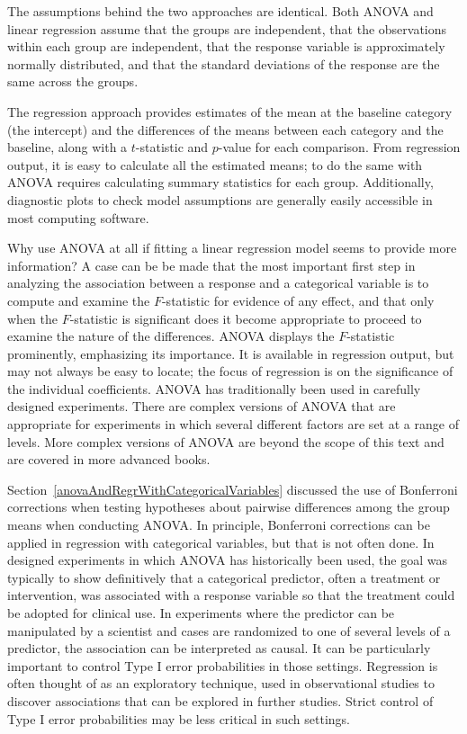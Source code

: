 The assumptions behind the two approaches are identical.  Both ANOVA and linear regression assume that the groups are independent, that the observations within each group are independent, that the response variable is approximately normally distributed, and that the standard deviations of the response are the same across the groups.  

The regression approach provides estimates of the mean at the baseline category (the intercept) and the differences of the means between each category and the baseline, along with a $t$-statistic and $p$-value for each comparison. From regression output, it is easy to calculate all the estimated means; to do the same with ANOVA requires calculating summary statistics for each group. Additionally, diagnostic plots to check model assumptions are generally easily accessible in most computing software.  

Why use ANOVA at all if fitting a linear regression model seems to provide more information?  A case can be be made that the most important first step in analyzing the association between a response and a categorical variable is to compute and examine the $F$-statistic for evidence of any effect, and that only when the $F$-statistic is significant does it become appropriate to proceed to examine the nature of the differences. ANOVA displays the $F$-statistic prominently, emphasizing its importance. It is available in regression output, but may not always be easy to locate; the focus of regression is on the significance of the individual coefficients.  ANOVA has traditionally been used in carefully designed experiments. There are complex versions of ANOVA that are appropriate for experiments in which several different factors are set at a range of levels.  More complex versions of ANOVA are beyond the scope of this text and are covered in more advanced books. 

Section~\ref{anovaAndRegrWithCategoricalVariables} discussed the use of Bonferroni corrections when testing hypotheses about pairwise differences among the group means when conducting ANOVA. In principle, Bonferroni corrections can be applied in regression with categorical variables, but that is not often done. In designed experiments in which ANOVA has historically been used, the goal was typically to show definitively that a categorical predictor, often a treatment or intervention, was associated with a response variable so that the treatment could be adopted for clinical use. In experiments where the predictor can be manipulated by a scientist and cases are randomized to one of several levels of a predictor, the association can be interpreted as causal.  It can be particularly important to control Type I error probabilities in those settings.  Regression is often thought of as an exploratory technique, used in observational studies to discover associations that can be explored in further studies.  Strict control of Type I error probabilities may be less critical in such settings.

